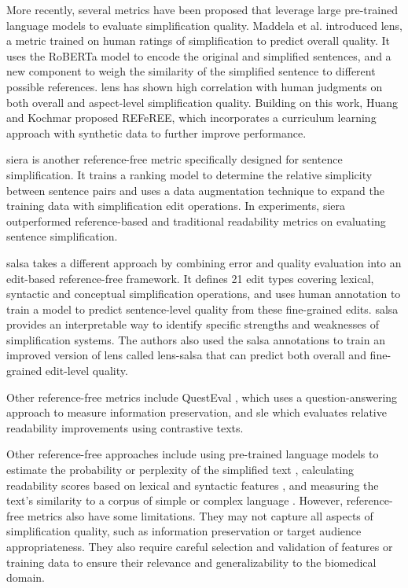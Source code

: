 More recently, several metrics have been proposed that leverage large pre-trained language models to evaluate simplification quality. 
Maddela et al. \cite{maddela-etal-2023-lens} introduced \gls{lens}, a metric trained on human ratings of simplification to predict overall quality. 
It uses the RoBERTa model to encode the original and simplified sentences, and a new component to weigh the similarity of the simplified sentence to different possible references. 
\gls{lens} has shown high correlation with human judgments on both overall and aspect-level simplification quality.
Building on this work, Huang and Kochmar \cite{huang-kochmar-2024-referee} proposed REFeREE, which incorporates a curriculum learning approach with synthetic data to further improve performance.

\gls{siera} \cite{yamanaka-tokunaga-2024-siera} is another reference-free metric specifically designed for sentence simplification. 
It trains a ranking model to determine the relative simplicity between sentence pairs and uses a data augmentation technique to expand the training data with simplification edit operations. 
In experiments, \gls{siera} outperformed reference-based and traditional readability metrics on evaluating sentence simplification.

\gls{salsa} \cite{heineman-etal-2023-dancing} takes a different approach by combining error and quality evaluation into an edit-based reference-free framework. 
It defines 21 edit types covering lexical, syntactic and conceptual simplification operations, and uses human annotation to train a model to predict sentence-level quality from these fine-grained edits. 
\gls{salsa} provides an interpretable way to identify specific strengths and weaknesses of simplification systems. 
The authors also used the \gls{salsa} annotations to train an improved version of \gls{lens} called \gls{lens}-\gls{salsa} that can predict both overall and fine-grained edit-level quality.

Other reference-free metrics include QuestEval \cite{scialom-etal-2021-rethinking}, which uses a question-answering approach to measure information preservation, and \gls{sle} \cite{kriz-etal-2020-simple} which evaluates relative readability improvements using contrastive texts.

Other reference-free approaches include using pre-trained language models to estimate the probability or perplexity of the simplified text \cite{ke-etal-2022-ctrleval}, calculating readability scores based on lexical and syntactic features \cite{Truica2023-au}, and measuring the text's similarity to a corpus of simple or complex language \cite{Truica2023-au}.
However, reference-free metrics also have some limitations. They may not capture all aspects of simplification quality, such as information preservation or target audience appropriateness. They also require careful selection and validation of features or training data to ensure their relevance and generalizability to the biomedical domain.